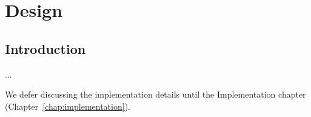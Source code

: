 

\chapter{Design}
\label{chap:design}



\section{Introduction}
\label{sec:designintroduction}

...

We defer discussing the implementation details until the Implementation chapter
(Chapter~\ref{chap:implementation}).


